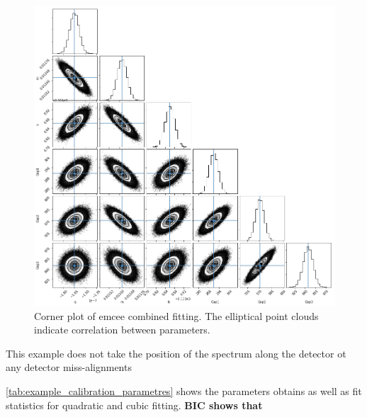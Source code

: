 \begin{figure}
    \centering
    \includegraphics[width=0.5\linewidth]{./figures/appendix/multidetecot_param_fit}
    \caption[Multi-detector parameter correlations.]{Corner plot of emcee combined fitting.
The elliptical point clouds indicate correlation between parameters.}
    \label{fig:multidetecotparamfit}
\end{figure}

This example does not take the  position of the spectrum along the detector ot any detector miss-alignments

\cref{tab:example_calibration_parametres} shows the parameters obtains as well as fit statistics for quadratic and cubic fitting.
\textbf{BIC shows that}

